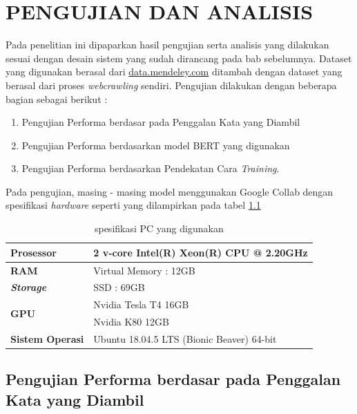 \chapter{PENGUJIAN DAN ANALISIS}
\label{chap:pengujiananalisis}

Pada penelitian ini dipaparkan hasil pengujian serta analisis yang dilakukan sesuai dengan desain sistem yang sudah dirancang pada bab sebelumnya. Dataset yang digunakan berasal dari \url{data.mendeley.com} ditambah dengan dataset yang berasal dari proses \textit{webcrawling} sendiri. Pengujian dilakukan dengan beberapa bagian sebagai berikut :

\begin{enumerate}[nolistsep]
    \item Pengujian Performa berdasar pada Penggalan Kata yang Diambil
    \item Pengujian Performa berdasarkan model BERT yang digunakan
    \item Pengujian Performa berdasarkan Pendekatan Cara \textit{Training}.
\end{enumerate}

Pada pengujian, masing - masing model menggunakan Google Collab dengan spesifikasi \textit{hardware} seperti yang dilampirkan pada tabel \ref{tab:specs}

\begin{table}[]
    \label{tab:specs}
    \caption{spesifikasi PC yang digunakan}
    \centering
    \begin{tabular}{|l|l|}
        \hline
        \textbf{Prosessor}            & 2 v-core Intel(R) Xeon(R) CPU @ 2.20GHz   \\ \hline
        \textbf{RAM}                  & Virtual Memory : 12GB                     \\ \hline
        \textit{\textbf{Storage}}     & SSD : 69GB                                \\ \hline
        \multirow{2}{*}{\textbf{GPU}} & Nvidia Tesla T4 16GB                      \\ \cline{2-2}
                                      & Nvidia K80 12GB                           \\ \hline
        \textbf{Sistem Operasi}       & Ubuntu 18.04.5 LTS (Bionic Beaver) 64-bit \\ \hline
    \end{tabular}
\end{table}

\section{Pengujian Performa berdasar pada Penggalan Kata yang Diambil}

